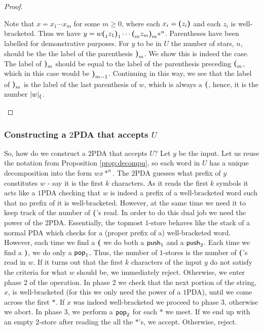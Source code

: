 \begin{proof}
\begin{itemize}
\begin{enumerate}
Note that $x = x_1 \cdots x_m$ for some $m \geq 0$, where each
$x_i = {\sf \textbf{(}}  z_i {\sf \textbf{)}}$ and each $z_i$ is well-bracketed. Thus we have $y = w {\sf \textbf{(}}_1 z_1{\sf \textbf{)}}_1 \cdots
{\sf \textbf{(}}_m z_m{\sf \textbf{)}}_m *^n$. Parentheses have been labelled for
demonstrative purposes. For $y$ to be in $U$ the number of stars,
$n$, should be the the label of the parenthesis ${\sf \textbf{)}}_m$. We show
this is indeed the case. The label of ${\sf \textbf{)}}_m$ should be equal to
the label of the parenthesis preceding ${\sf \textbf{(}}_m$, which in this case
would be ${\sf \textbf{)}}_{m-1}$. Continuing in this way, we see that the
label of ${\sf \textbf{)}}_m$ is the label of the last parenthesis of $w$,
which is always a ${\sf \textbf{(}} $, hence, it is the number $|w|_{{\sf \textbf{(}} }$.
\end{enumerate}
\end{itemize}
\end{proof}

\subsubsection*{Constructing a $2$PDA that accepts $U$}

So, how do we construct a $2$PDA that accepts $U$? Let $y$ be the
input. Let us reuse the notation from Proposition \ref{prop:decompu},
so each word in $U$ has a unique decomposition into the form $wx*^n$. The $2$PDA guesses what prefix of $y$ constitutes $w$ - say
it is the first $k$ characters. As it reads the first $k$ symbols
it acts like a $1$PDA checking that $w$ is indeed a prefix of a
well-bracketed word such that no prefix of it is well-bracketed.
However, at the same time we need it to keep track of the number
of ${\sf \textbf{(}}$'s read. In order to do this dual job we need the power of
the $2$PDA. Essentially, the topmost $1$-store behaves like the
stack of a normal PDA which checks for a (proper prefix of a)
well-bracketed word. However, each time we find a ${\sf \textbf{(}}$ we do both
a ${\sf push}_1$ and a ${\sf push}_2$. Each time we find a ${\sf \textbf{)}}$, we do only
a ${\sf pop}_1$. Thus, the number of $1$-stores is the number of
${\sf \textbf{(}}$'s read in $w$. If it turns out that the first $k$ characters
of the input $y$ do not satisfy the criteria for what $w$ should
be, we immediately reject. Otherwise, we enter phase 2 of the
operation. In phase 2 we check that the next portion of the string, $x$, is
well-bracketed (for this we only need the power of a $1$PDA),
until we come across the first $\ast$. If $x$ was indeed
well-bracketed we proceed to phase $3$, otherwise we abort. In phase
$3$, we perform a ${\sf pop}_2$ for each $\ast$ we meet. If we end up with
an empty $2$-store after reading the all the $\ast$'s, we accept. Otherwise, reject.


